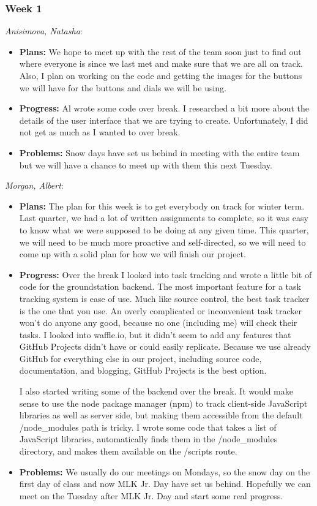 \documentclass[10pt,draftclsnofoot,onecolumn]{IEEEtran}
\newcommand{\subsubsubsection}[1]{
	\hfill\break\textit{#1}:
}
\begin{document}
\subsubsection{Week 1}
\subsubsubsection{Anisimova, Natasha}
\begin{itemize}
	\item \textbf{Plans: }
	We hope to meet up with the rest of the team soon just to find out where everyone is since we last met and make sure that we are all on track. Also, I plan on working on the code and getting the images for the buttons we will have for the buttons and dials we will be using.
	\item \textbf{Progress: }
	Al wrote some code over break. I researched a bit more about the details of the user interface that we are trying to create. Unfortunately, I did not get as much as I wanted to over break.

	\item \textbf{Problems: }
	Snow days have set us behind in meeting with the entire team but we will have a chance to meet up with them this next Tuesday.
\end{itemize}
\subsubsubsection{Morgan, Albert}
\begin{itemize}
	\item \textbf{Plans: }
	The plan for this week is to get everybody on track for winter term. Last quarter, we had a lot of written assignments to complete, so it was easy to know what we were supposed to be doing at any given time. This quarter, we will need to be much more proactive and self-directed, so we will need to come up with a solid plan for how we will finish our project.
	\item \textbf{Progress: }
	Over the break I looked into task tracking and wrote a little bit of code for the groundstation backend. The most important feature for a task tracking system is ease of use. Much like source control, the best task tracker is the one that you use. An overly complicated or inconvenient task tracker won't do anyone any good, because no one (including me) will check their tasks. I looked into waffle.io, but it didn't seem to add any features that GitHub Projects didn't have or could easily replicate. Because we use already GitHub for everything else in our project, including source code, documentation, and blogging, GitHub Projects is the best option.

	I also started writing some of the backend over the break. It would make sense to use the node package manager (npm) to track client-side JavaScript libraries as well as server side, but making them accessible from the default /node\_modules path is tricky. I wrote some code that takes a list of JavaScript libraries, automatically finds them in the /node\_modules directory, and makes them available on the /scripts route.
	\item \textbf{Problems: }
	We usually do our meetings on Mondays, so the snow day on the first day of class and now MLK Jr. Day have set us behind. Hopefully we can meet on the Tuesday after MLK Jr. Day and start some real progress.
\end{itemize}
\end{document}
